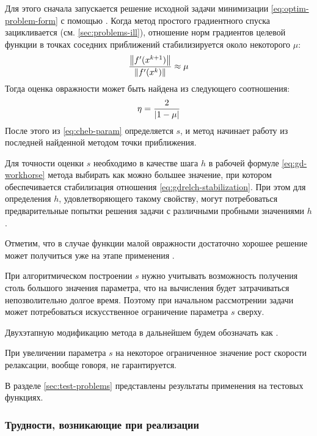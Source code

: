 Для этого сначала запускается решение исходной задачи минимизации
\eqref{eq:optim-problem-form} с помощью \gd{}. Когда метод простого
градиентного спуска зацикливается (см. \ref{sec:problems-ill}),
отношение норм градиентов целевой функции в точках соседних
приближений стабилизируется около некоторого $\mu$:
\begin{equation}
  \label{eq:gdrelch-stabilization}
  \frac{\left \lVert{f'(x^{k+1})}\right \rVert}{\left \lVert{f'(x^k)}\right \rVert} \approx \mu
\end{equation}
Тогда оценка овражности может быть найдена из следующего
соотношения:
\begin{equation*}
  \eta = \frac{2}{\left \lvert{1-\mu}\right \rvert}
\end{equation*}
После этого из \eqref{eq:cheb-param} определяется $s$, и метод
\relch{} начинает работу из последней найденной методом \gd{} точки
приближения.

Для точности оценки $s$ необходимо в качестве шага $h$ в рабочей
формуле \eqref{eq:gd-workhorse} метода \gd{} выбирать как можно
большее значение, при котором обеспечивается стабилизация отношения
\eqref{eq:gdrelch-stabilization}. При этом для определения $h$,
удовлетворяющего такому свойству, могут потребоваться предварительные
попытки решения задачи с различными пробными значениями $h$.

Отметим, что в случае функции малой овражности достаточно хорошее
решение может получиться уже на этапе применения \gd{}.

При алгоритмическом построении $s$ нужно учитывать возможность
получения столь большого значения параметра, что на вычисления будет
затрачиваться непозволительно долгое время. Поэтому при начальном
рассмотрении задачи может потребоваться искусственное ограничение
параметра $s$ сверху.

Двухэтапную модификацию метода \relch{} в дальнейшем будем обозначать
как \gdrelch{}.

\begin{rem}
  \label{rem:cheb-rel-speed}
  При увеличении параметра $s$ на некоторое ограниченное значение рост
  скорости релаксации, вообще говоря, не гарантируется.
\end{rem}

В разделе \ref{sec:test-problems} представлены результаты применения
\gdrelch{} на тестовых функциях.

\subsubsection{Трудности, возникающие при реализации \relch{}}

